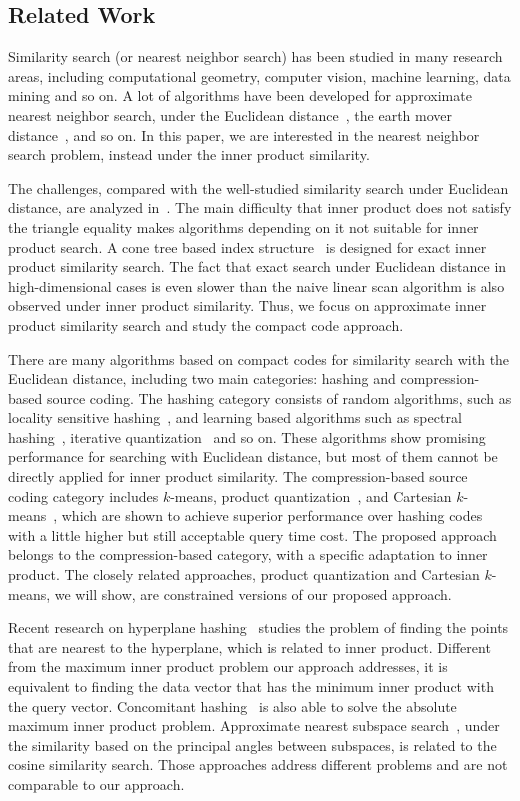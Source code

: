 \documentclass[10pt, letterpaper]{article}
\begin{document}
\subsection{Related Work}
Similarity search (or nearest neighbor search)
has been studied in many research areas,
including computational geometry,
computer vision,
machine learning,
data mining
and so on.
A lot of algorithms have been developed
for approximate nearest neighbor search,
under
the Euclidean distance~\cite{Bentley75,SameFoun2006},
the earth mover distance~\cite{Andoni09,GraumanD04},
and so on.
In this paper,
we are interested in the nearest neighbor search problem,
instead under the inner product similarity.

The challenges, compared with the well-studied
similarity search under Euclidean distance, are analyzed
in~\cite{RamG12}. The main difficulty that inner product does
not satisfy the triangle equality makes algorithms depending on
it not suitable for inner product search. A cone tree based
index structure~\cite{RamG12} is designed for exact inner product
similarity search. The fact that exact search under Euclidean
distance in high-dimensional cases is even slower than the
naive linear scan algorithm is also observed under inner product
similarity. Thus, we focus on approximate
inner product similarity search and study the compact code
approach.

There are many algorithms based on compact codes
for similarity search with the Euclidean distance,
including two main categories:
hashing and compression-based source coding.
The hashing category consists of
random algorithms,
such as locality sensitive hashing~\cite{DatarIIM04},
and learning based algorithms
such as spectral hashing~\cite{WeissTF08},
iterative quantization~\cite{GongL11}
and so on.
These algorithms show promising performance for searching with Euclidean distance,
but most of them cannot be directly applied for inner product similarity.
The compression-based source coding category includes
$k$-means, product quantization~\cite{JegouDS11},
and Cartesian $k$-means~\cite{NorouziF13},
which are shown to achieve superior
performance over hashing codes
with a little higher but still acceptable query time cost.
The proposed approach belongs to the compression-based category,
with a specific adaptation to inner product.
The closely related approaches,
product quantization
and Cartesian $k$-means,
we will show,
are constrained versions of
our proposed approach.


Recent research on hyperplane hashing~\cite{JainVG10,LiuWMKC12,MuWC12}
studies the problem of finding the points
that are nearest to the hyperplane, which is related to inner
product. Different from the maximum inner product problem our
approach addresses, it is equivalent to finding the data vector
that has the minimum inner product with the query vector.
Concomitant hashing~\cite{MuWC12} is also able to solve the absolute
maximum inner product problem.
Approximate nearest subspace search~\cite{BasriHZ11}, under the
similarity based on the principal angles between subspaces, is
related to the cosine similarity search. Those approaches
address different problems and are not comparable to our
approach.
\end{document}
